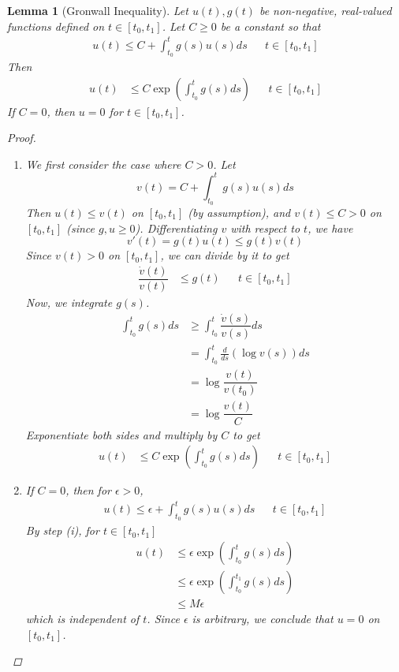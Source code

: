\documentclass{article}
\newtheorem{lemma}[theorem]{Lemma}
\begin{document}
\begin{lemma}[Gronwall Inequality]
Let $u(t), g(t)$ be non-negative, real-valued functions defined on $t \in [t_0, t_1]$. Let $C \geq 0$ be a constant so that
\begin{align*}
u(t) \leq C + \int_{t_0}^t g(s) u(s) ds && t \in [t_0, t_1]
\end{align*}
Then
\begin{align*}
u(t) &\leq C \exp \left( \int_{t_0}^t g(s) ds \right) && t \in [t_0, t_1]
\end{align*}
If $C = 0$, then $u = 0$ for $t \in [t_0, t_1]$.
\begin{proof}
\begin{enumerate}
\item We first consider the case where $C > 0$. Let
\[
v(t) = C + \int_{t_0}^t g(s) u(s) ds
\]
Then $u(t) \leq v(t)$ on $[t_0, t_1]$ (by assumption), and $v(t) \leq C > 0$ on $[t_0, t_1]$ (since $g, u \geq 0$). Differentiating $v$ with respect to $t$, we have
\[
v'(t) = g(t) u(t) \leq g(t)v(t)
\] 
Since $v(t) > 0$ on $[t_0, t_1]$, we can divide by it to get
\begin{align*}
\dfrac{\dot{v}(t)}{v(t)} &\leq g(t) && t \in [t_0, t_1]
\end{align*}
Now, we integrate $g(s)$.
\begin{align*}
\int_{t_0}^t g(s) ds &\geq \int_{t_0}^t \dfrac{\dot{v}(s)}{v(s)} ds \\
&= \int_{t_0}^t \frac{d}{ds}\left( \log {v(s)} \right) ds \\
&= \log\dfrac{v(t)}{v(t_0)}\\
&= \log\dfrac{v(t)}{C}
\end{align*}
Exponentiate both sides and multiply by $C$ to get
\begin{align*}
u(t) &\leq C \exp \left( \int_{t_0}^t g(s) ds \right) && t \in [t_0, t_1]
\end{align*}
\item If $C = 0$, then for $\epsilon > 0$,
\begin{align*}
u(t) \leq \epsilon + \int_{t_0}^t g(s) u(s) ds && t \in [t_0, t_1]
\end{align*}
By step (i), for $t \in [t_0, t_1]$ 
\begin{align*}
u(t) &\leq \epsilon \exp \left( \int_{t_0}^t g(s) ds \right) \\&\leq \epsilon \exp \left( \int_{t_0}^{t_1} g(s) ds \right) \\
&\leq M \epsilon
\end{align*}
which is independent of $t$. Since $\epsilon$ is arbitrary, we conclude that $u = 0$ on $[t_0, t_1]$.
\end{enumerate}
\end{proof}
\end{lemma}
\end{document}
